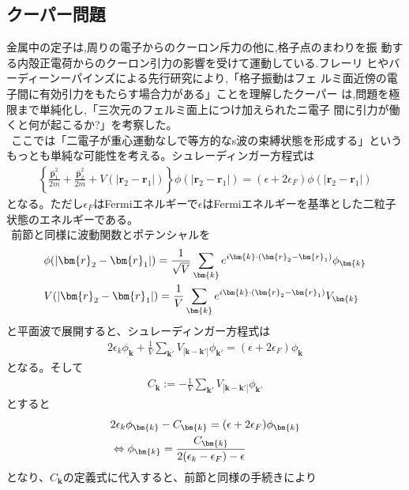\documentclass[dvipdfmx, 11pt, a4paper]{jsarticle}
\numberwithin{equation}{section}
\theoremstyle{definition}
\begin{document}
\subsection{クーパー問題}
    金属中の定子は,周りの電子からのクーロン斥力の他に,格子点のまわりを振
    動する内殻正電荷からのクーロン引力の影響を受けて運動している.フレーリ
    ヒやバーディーンーパインズによる先行研究により,「格子振動はフェ
    ルミ面近傍の電子間に有効引力をもたらす場合力がある」ことを理解したクーパー
    は,問題を極限まで単純化し,「三次元のフェルミ面上につけ加えられたニ電子
    間に引力が働くと何が起こるか?」を考察した。\\
    $\ \ $ここでは「二電子が重心運動なしで等方的なs波の束縛状態を形成する」というもっとも単純な可能性を考える。シュレーディンガー方程式は
    \begin{align}
        \left\{ \frac{\bm{\hat{p}}_1^2}{2m} + \frac{\bm{\hat{p}}_2^2}{2m} + V(|\bm{r}_2-\bm{r}_1|) \right\} \phi(|\bm{r}_2-\bm{r}_1|) = (\epsilon + 2\epsilon_{F})\phi(|\bm{r}_2-\bm{r}_1|)
    \end{align}
    となる。ただし$\epsilon_F$はFermiエネルギーで$\epsilon$はFermiエネルギーを基準とした二粒子状態のエネルギーである。\\
    $\ \ $前節と同様に波動関数とポテンシャルを
    \begin{align}
        &\phi(|\bm{r}_2-\bm{r}_1|) = \frac{1}{\sqrt{V}} \sum_{\bm{k}} e^{i\bm{k}\cdot (\bm{r}_2 - \bm{r}_1)} \phi_{\bm{k}} \notag \\
        &V(|\bm{r}_2-\bm{r}_1|) = \frac{1}{V} \sum_{\bm{k}} e^{i\bm{k}\cdot (\bm{r}_2 - \bm{r}_1)} V_{\bm{k}}
    \end{align}
    と平面波で展開すると、シュレーディンガー方程式は
    \begin{align}
        2\epsilon_k \phi_{\bm{k}} + \frac{1}{V}\sum_{\bm{k}'}V_{|\bm{k}-\bm{k}'|}\phi_{\bm{k'}} = (\epsilon+2\epsilon_F)\phi_{\bm{k}}
    \end{align}
    となる。そして
    \begin{align}
        C_{\bm{k}} := -\frac{1}{V}\sum_{\bm{k}'}V_{|\bm{k}-\bm{k}'|}\phi_{\bm{k'}}
    \end{align}
    とすると
    \begin{align}
        &2\epsilon_k \phi_{\bm{k}} -C_{\bm{k}} = (\epsilon+2\epsilon_F)\phi_{\bm{k}} \notag \\
        &\Leftrightarrow \phi_{\bm{k}} = \frac{C_{\bm{k}}}{2(\epsilon_k - \epsilon_F)-\epsilon}
    \end{align}
    となり、$C_{\bm{k}}$の定義式に代入すると、前節と同様の手続きにより
\end{document}
